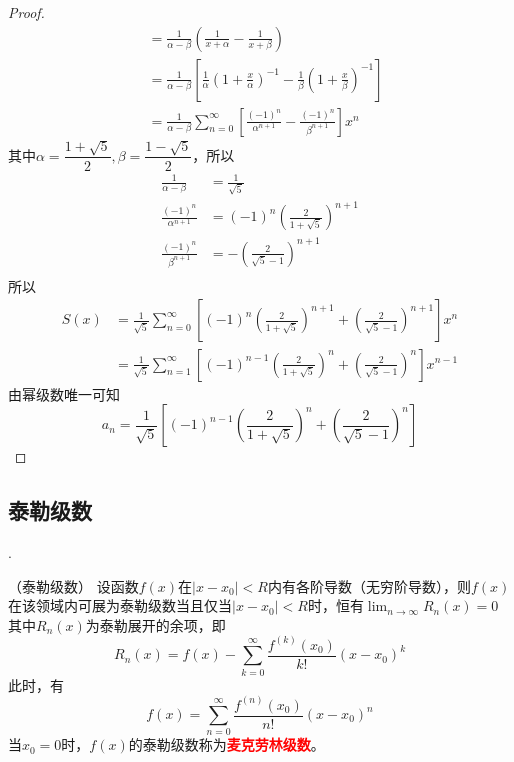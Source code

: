\begin{proof}
\begin{align*}
         & = \frac{1}{\alpha-\beta}\left(\frac{1}{x+\alpha} - \frac{1}{x+\beta}\right)                                                                        \\
         & = \frac{1}{\alpha-\beta}\left[\frac{1}{\alpha}\left(1 + \frac{x}{\alpha}\right)^{-1} - \frac{1}{\beta}\left(1 + \frac{x}{\beta}\right)^{-1}\right] \\
         & = \frac{1}{\alpha-\beta} \sum_{n=0}^\infty\left[\frac{(-1)^n}{\alpha^{n+1}} - \frac{(-1)^n}{\beta^{n+1}}\right]x^n
    \end{align*}
    其中$\alpha = \dfrac{1+\sqrt{5}}{2},\beta = \dfrac{1-\sqrt{5}}{2}$，所以
    \begin{align*}
        \frac{1}{\alpha-\beta}      & = \frac{1}{\sqrt{5}}                            \\
        \frac{(-1)^n}{\alpha^{n+1}} & = (-1)^n\left(\frac{2}{1+\sqrt{5}}\right)^{n+1} \\
        \frac{(-1)^n}{\beta^{n+1}}  & = -\left(\frac{2}{\sqrt{5}-1}\right)^{n+1}      \\
    \end{align*}
    所以
    \begin{align*}
        S(x)
         & = \frac{1}{\sqrt{5}}\sum_{n=0}^\infty\left[(-1)^n\left(\frac{2}{1+\sqrt{5}}\right)^{n+1} + \left(\frac{2}{\sqrt{5}-1}\right)^{n+1} \right]x^n \\
         & = \frac{1}{\sqrt{5}}\sum_{n=1}^\infty\left[(-1)^{n-1}\left(\frac{2}{1+\sqrt{5}}\right)^n + \left(\frac{2}{\sqrt{5}-1}\right)^n \right]x^{n-1}
    \end{align*}
    由幂级数唯一可知
    \[ a_n = \frac{1}{\sqrt{5}} \left[(-1)^{n-1}\left(\frac{2}{1+\sqrt{5}}\right)^n + \left(\frac{2}{\sqrt{5}-1}\right)^n \right] \]
\end{proof}

\subsection{泰勒级数}
.
\begin{theorem}
    （泰勒级数）
    \label{th:泰勒级数}
    设函数$f(x)$在$|x-x_0|<R$内有各阶导数（无穷阶导数），则$f(x)$在该领域内可展为泰勒级数当且仅当$|x-x_0|<R$时，恒有$\displaystyle\lim_{n\to\infty}R_n(x)=0$
    其中$R_n(x)$为泰勒展开的余项，即
    \[ R_n(x) = f(x) - \sum_{k=0}^{\infty}\frac{f^{(k)}(x_0)}{k!}(x-x_0)^k \]
    此时，有
    \[ f(x) = \sum_{n=0}^\infty \frac{f^{(n)}(x_0)}{n!}(x-x_0)^n \]
    当$x_0=0$时，$f(x)$的泰勒级数称为\textcolor{red}{\textbf{\textsf{麦克劳林级数}}}。
\end{theorem}

